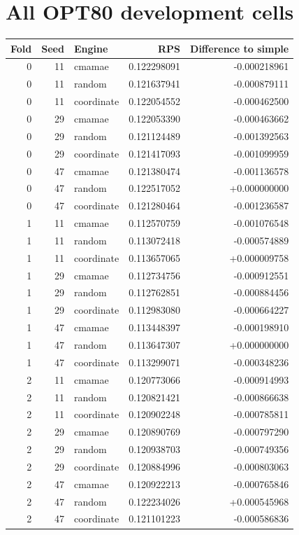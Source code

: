 \documentclass[10pt]{article}
\begin{document}
\section{All OPT80 development cells}
\begin{longtable}{rrlrr}\toprule
Fold & Seed & Engine & RPS & Difference to simple\\\midrule
0 & 11 & cmamae & 0.122298091 & -0.000218961\\
0 & 11 & random & 0.121637941 & -0.000879111\\
0 & 11 & coordinate & 0.122054552 & -0.000462500\\
0 & 29 & cmamae & 0.122053390 & -0.000463662\\
0 & 29 & random & 0.121124489 & -0.001392563\\
0 & 29 & coordinate & 0.121417093 & -0.001099959\\
0 & 47 & cmamae & 0.121380474 & -0.001136578\\
0 & 47 & random & 0.122517052 & +0.000000000\\
0 & 47 & coordinate & 0.121280464 & -0.001236587\\
1 & 11 & cmamae & 0.112570759 & -0.001076548\\
1 & 11 & random & 0.113072418 & -0.000574889\\
1 & 11 & coordinate & 0.113657065 & +0.000009758\\
1 & 29 & cmamae & 0.112734756 & -0.000912551\\
1 & 29 & random & 0.112762851 & -0.000884456\\
1 & 29 & coordinate & 0.112983080 & -0.000664227\\
1 & 47 & cmamae & 0.113448397 & -0.000198910\\
1 & 47 & random & 0.113647307 & +0.000000000\\
1 & 47 & coordinate & 0.113299071 & -0.000348236\\
2 & 11 & cmamae & 0.120773066 & -0.000914993\\
2 & 11 & random & 0.120821421 & -0.000866638\\
2 & 11 & coordinate & 0.120902248 & -0.000785811\\
2 & 29 & cmamae & 0.120890769 & -0.000797290\\
2 & 29 & random & 0.120938703 & -0.000749356\\
2 & 29 & coordinate & 0.120884996 & -0.000803063\\
2 & 47 & cmamae & 0.120922213 & -0.000765846\\
2 & 47 & random & 0.122234026 & +0.000545968\\
2 & 47 & coordinate & 0.121101223 & -0.000586836\\
\bottomrule\end{longtable}
\end{document}

